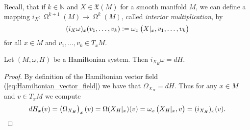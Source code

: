 Recall, that if $k \in \mathbb{N}$ and $X \in \mathfrak{X}(M)$ for a smooth manifold $M$, we can define a mapping $i_X : \upOmega^{k + 1}(M) \to \upOmega^k(M)$, called \emph{interior multiplication}, by
\begin{equation*}
	(i_X\omega)_x(v_1,\dots,v_k) := \omega_x\del[1]{X\vert_x,v_1,\dots,v_k}
\end{equation*}
\noindent for all $x \in M$ and $v_1,\dots,v_k \in T_xM$.

\begin{lemma}
	Let $(M,\omega,H)$ be a Hamiltonian system. Then $i_{X_H}\omega = dH$.
\end{lemma}

\begin{proof}
	By definition of the Hamiltonian vector field (\ref{eq:Hamiltonian_vector_field}) we have that $\Omega_{X_H} = dH$. Thus for any $x \in M$ and $v \in T_xM$ we compute
	\begin{equation*}
		dH_x(v) = \del[1]{\Omega_{X_H}}_x(v) = \Omega(X_H\vert_x)(v) = \omega_x\del[1]{X_H\vert_x,v} = (i_{X_H})_x(v). 
	\end{equation*}
\end{proof}
